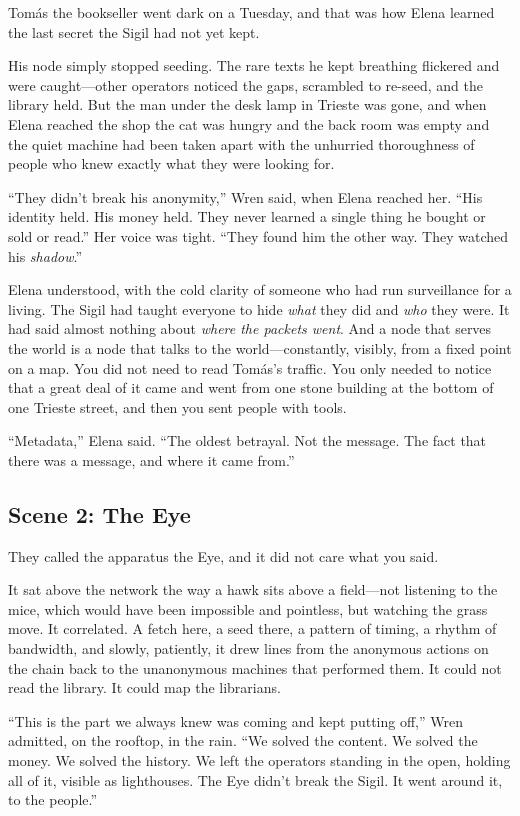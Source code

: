 \documentclass[12pt,letterpaper]{book}
\begin{document}
Tomás the bookseller went dark on a Tuesday, and that was how Elena learned the
last secret the Sigil had not yet kept.

His node simply stopped seeding. The rare texts he kept breathing flickered and
were caught---other operators noticed the gaps, scrambled to re-seed, and the
library held. But the man under the desk lamp in Trieste was gone, and when Elena
reached the shop the cat was hungry and the back room was empty and the quiet
machine had been taken apart with the unhurried thoroughness of people who knew
exactly what they were looking for.

``They didn't break his anonymity,'' Wren said, when Elena reached her. ``His
identity held. His money held. They never learned a single thing he bought or
sold or read.'' Her voice was tight. ``They found him the other way. They watched
his \emph{shadow}.''

Elena understood, with the cold clarity of someone who had run surveillance for a
living. The Sigil had taught everyone to hide \emph{what} they did and \emph{who}
they were. It had said almost nothing about \emph{where the packets went}. And a
node that serves the world is a node that talks to the world---constantly,
visibly, from a fixed point on a map. You did not need to read Tomás's traffic.
You only needed to notice that a great deal of it came and went from one stone
building at the bottom of one Trieste street, and then you sent people with tools.

``Metadata,'' Elena said. ``The oldest betrayal. Not the message. The fact that
there was a message, and where it came from.''

\hypertarget{scene-2-the-eye}{%
\subsection{Scene 2: The Eye}\label{scene-2-the-eye}}

They called the apparatus the Eye, and it did not care what you said.

It sat above the network the way a hawk sits above a field---not listening to the
mice, which would have been impossible and pointless, but watching the grass move.
It correlated. A fetch here, a seed there, a pattern of timing, a rhythm of
bandwidth, and slowly, patiently, it drew lines from the anonymous actions on the
chain back to the unanonymous machines that performed them. It could not read the
library. It could map the librarians.

``This is the part we always knew was coming and kept putting off,'' Wren admitted,
on the rooftop, in the rain. ``We solved the content. We solved the money. We
solved the history. We left the operators standing in the open, holding all of it,
visible as lighthouses. The Eye didn't break the Sigil. It went around it, to the
people.''
\end{document}
